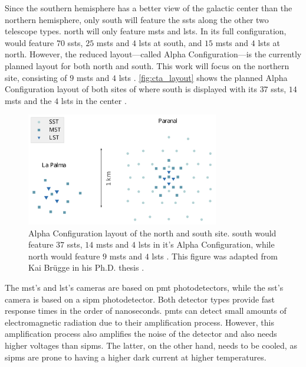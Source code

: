 Since the southern hemisphere has a better view of the galactic center than the northern hemisphere,
only \cta{} south will feature the \glspl{sst} along the other two telescope types. \cta{} north
will only feature \glspl{mst} and \glspl{lst}. In its full configuration, \cta{} would feature
\(\num{70}\) \glspl{sst}, \(\num{25}\) \glspl{mst} and \(\num{4}\) \glspl{lst} at \cta{} south,
and \(\num{15}\) \glspl{mst} and \(\num{4}\) \glspl{lst} at \cta{} north. However, the reduced
layout---called Alpha Configuration---is the currently planned layout for both \cta{}
north and south. This work will focus on the northern site, consisting of \(\num{9}\) \glspl{mst}
and \(\num{4}\) \glspl{lst} \cite{cta_north_layout}. \autoref{fig:cta_layout} shows the planned
Alpha Configuration layout of both sites of \cta{} where \cta{} south is displayed with its
\(\num{37}\) \glspl{sst}, \(\num{14}\) \glspl{mst} and the \(\num{4}\) \glspl{lst} in the center
\cite{cta_south_layout}.
\begin{figure}
    \centering
    \includegraphics[width=0.75\textwidth]{graphics/cta_layout.pdf}
    \caption{Alpha Configuration layout of the \cta{} north and \cta{}
    south site. \cta{} south would feature \(\num{37}\) \glspl{sst}, \(\num{14}\) \glspl{mst} and
    \(\num{4}\) \glspl{lst} \cite{cta_south_layout} in it's Alpha Configuration, while \cta{} north would
    feature \(\num{9}\) \glspl{mst} and \(\num{4}\) \glspl{lst} \cite{cta_north_layout}.
    This figure was adapted from Kai Br\"ugge in his Ph.D. thesis \cite{bruegge_thesis}.}
    \label{fig:cta_layout}
\end{figure}

The \gls{mst}'s and \gls{lst}'s cameras are based on \gls{pmt} photodetectors, while the \gls{sst}'s
camera is based on a \gls{sipm} photodetector. Both detector types provide fast response times in the
order of nanoseconds. \glspl{pmt} can detect small amounts of electromagnetic radiation due to their
amplification process. However, this amplification process also amplifies the noise of the detector
and also needs higher voltages than \glspl{sipm}. The latter, on the other hand, needs to be cooled,
as \glspl{sipm} are prone to having a higher dark current at higher temperatures.

